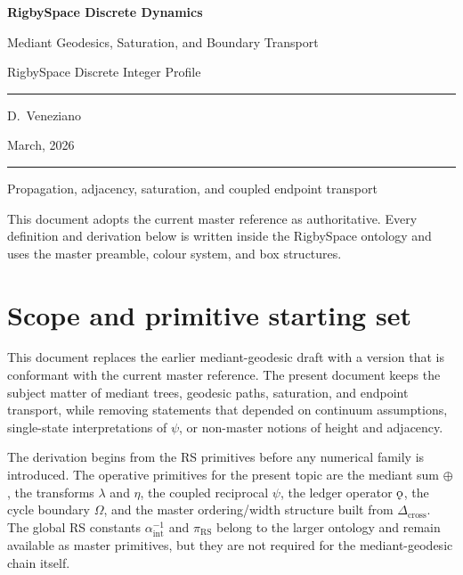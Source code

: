 \documentclass[11pt, letterpaper]{article}
\newcommand{\lop}{\lambda}
\newcommand{\aop}{\eta}
\newcommand{\med}{\oplus}
\newcommand{\Dcross}{\Delta_{\mathrm{cross}}}
\newcommand{\koppa}{\mathbin{\text{\rm\k{o}}}}
\newcommand{\aSC}{\alpha^{-1}_{\mathrm{int}}}
\newcommand{\piRS}{\pi_{\mathrm{RS}}}
\theoremstyle{definition}
\theoremstyle{plain}
\begin{document}
\begin{titlepage}
  \centering
  \vspace*{2cm}
  {\Huge\bfseries\color{RSblue} RigbySpace Discrete Dynamics\par}
  \vspace{0.5cm}
  {\LARGE Mediant Geodesics, Saturation, and Boundary Transport\par}
  \vspace{0.5cm}
  {\large RigbySpace Discrete Integer Profile\par}
  \vspace{2cm}
  \rule{0.6\textwidth}{0.4pt}\par
  \vspace{1cm}
  {\large D.\ Veneziano\par}
  \vspace{0.8cm}
  {\normalsize March, 2026\par}
  \vspace{1.5cm}
  \rule{0.6\textwidth}{0.4pt}\par
  \vspace{0.5cm}
  {\small Propagation, adjacency, saturation, and coupled endpoint transport\par}
  \vfill
  {\small\color{RSgray}
  This document adopts the current master reference as authoritative.  Every
  definition and derivation below is written inside the RigbySpace ontology and
  uses the master preamble, colour system, and box structures.\par}
\end{titlepage}

\tableofcontents
\newpage

\section{Scope and primitive starting set}

This document replaces the earlier mediant-geodesic draft with a version that is
conformant with the current master reference.  The present document keeps the
subject matter of mediant trees, geodesic paths, saturation, and endpoint
transport, while removing statements that depended on continuum assumptions,
single-state interpretations of $\psi$, or non-master notions of height and
adjacency.

The derivation begins from the RS primitives before any numerical family is
introduced.  The operative primitives for the present topic are the mediant
sum $\med$, the transforms $\lop$ and $\aop$, the coupled reciprocal $\psi$,
the ledger operator $\koppa$, the cycle boundary $\Omega$, and the master
ordering/width structure built from $\Dcross$.  The global RS constants
$\aSC$ and $\piRS$ belong to the larger ontology and remain available as
master primitives, but they are not required for the mediant-geodesic chain
itself.
\end{document}
